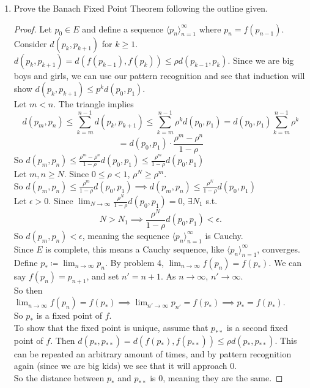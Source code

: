 \documentclass[14pt]{extarticle}
\begin{document}
\begin{enumerate}
		\item Prove the Banach Fixed Point Theorem following the outline given.
		\begin{proof}
			Let $p_0 \in E$ and define a sequence $\langle p_n \rangle^\infty_{n=1}$ where $p_n = f(p_{n-1})$.\\
			Consider $d(p_k,p_{k+1})$ for $k\geq1$.\\
			$d(p_k,p_{k+1}) = d(f(p_{k-1}),f(p_k)) \leq \rho d(p_{k-1},p_k)$. Since we are big boys and girls, we can use our pattern recognition and see that induction will show $d(p_k,p_{k+1}) \leq p^kd(p_0,p_1)$.\\
			Let $m<n$. The triangle implies 
			\[d(p_m,p_n) \leq \sum_{k=m}^{n-1} d(p_k,p_{k+1}) \leq \sum_{k=m}^{n-1} \rho^kd(p_0,p_{1}) = d(p_0,p_1)\sum_{k=m}^{n-1} \rho^k\]
			\[= d(p_0,p_1)\cdot\frac{\rho^m-\rho^n}{1-\rho}\]
			So $d(p_m,p_n) \leq \frac{\rho^m-\rho^n}{1-\rho} d(p_0,p_1) \leq \frac{\rho^m}{1-\rho} d(p_0,p_1)$\\
			Let $m,n \geq N$. Since $0\leq\rho<1$, $\rho^N \geq \rho^m$.\\
			So $d(p_m,p_n) \leq \frac{\rho^m}{1-\rho} d(p_0,p_1) \implies  d(p_m,p_n) \leq \frac{\rho^N}{1-\rho} d(p_0,p_1)$\\
			Let $\epsilon>0$. Since $\lim_{N\rightarrow\infty} \frac{\rho^N}{1-\rho}d(p_0,p_1) = 0$, $\exists N_1$ s.t. $$N>N_1 \implies \frac{\rho^N}{1-\rho}d(p_0,p_1) < \epsilon.$$ So $d(p_m,p_n) < \epsilon$, meaning the sequence $\langle p_n \rangle^\infty_{n=1}$ is Cauchy.\\
			Since $E$ is complete, this means a Cauchy sequence, like $\langle p_n \rangle^\infty_{n=1}$, converges.\\
			Define $p_* \coloneq \lim_{n\rightarrow\infty}p_n$. By problem 4, $\lim_{n\rightarrow\infty}f(p_n) = f(p_*)$. We can say $f(p_n) = p_{n+1}$, and set $n' = n+1$. As $n\rightarrow\infty$, $n'\rightarrow\infty$.\\
			So then $\lim_{n\rightarrow\infty}f(p_n) = f(p_*) 
			\implies \lim_{n'\rightarrow\infty}p_{n'} = f(p_*) \implies
			p_* = f(p_*)$.\\
			So $p_*$ is a fixed point of $f$.\\
			To show that the fixed point is unique, assume that $p_{**}$ is a second fixed point of $f$. Then $d(p_*,p_{**}) = d(f(p_*),f(p_{**})) \leq \rho d(p_*,p_{**})$. This can be repeated an arbitrary amount of times, and by pattern recognition again (since we are big kids) we see that it will approach 0.\\
			So the distance between $p_*$ and $p_{**}$ is 0, meaning they are the same. 
		\end{proof}
		

\end{enumerate}
\end{document}

